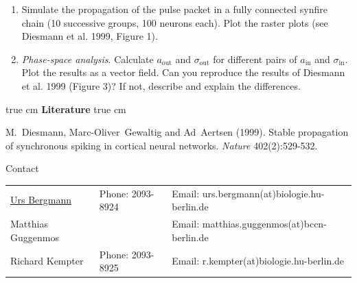 \documentclass[12pt]{article}
\begin{document}
\begin{enumerate}
    \item Simulate the propagation of the pulse packet in a fully
        connected synfire chain (10 successive groups, 100 neurons
        each). Plot the raster plots (see Diesmann et al. 1999, Figure
        1).

    \item \textit{Phase-space analysis}. Calculate $a_\mathrm{out}$
        and $\sigma_\mathrm{out}$ for different pairs of
        $a_\mathrm{in}$ and  $\sigma_\mathrm{in}$. Plot the results as
        a vector field. Can you reproduce the results of Diesmann et
        al. 1999 (Figure 3)? If not, describe and explain the
        differences.

\end{enumerate}

 true cm
{\bf Literature} 
 true cm

M.~Diesmann, Marc-Oliver~Gewaltig and Ad~Aertsen (1999). Stable propagation of
synchronous spiking in cortical neural networks.
\emph{Nature} 402(2):529-532.\newline

\vfill
\centerline{\CAP Contact}
\CAP

\begin{tabular}{lll}
\underline{Urs Bergmann} & Phone: 2093-8924 & Email:
urs.bergmann(at)biologie.hu-berlin.de \\
Matthias Guggenmos & & Email: matthias.guggenmos(at)bccn-berlin.de \\
Richard Kempter \hfill & Phone: 2093-8925 \hfill & Email:
r.kempter(at)biologie.hu-berlin.de \\
\end{tabular}
\end{document}
